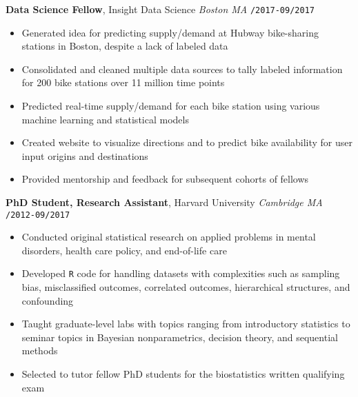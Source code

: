 \documentclass[10pt,english]{report}
\begin{document}
\textbf{Data Science Fellow}, Insight Data Science \hfill \textit{Boston MA} \texttt{/2017-09/2017}
\begin{itemize}
\item Generated idea for predicting supply/demand at Hubway bike-sharing stations in Boston, despite a lack of labeled data
\item Consolidated and cleaned multiple data sources to tally labeled information for 200 bike stations over 11 million time points
\item Predicted real-time supply/demand for each bike station using various machine learning and statistical models
\item Created website to visualize directions and to predict bike availability for user input origins and destinations
\item Provided mentorship and feedback for subsequent cohorts of fellows
\end{itemize}

\vspace{1mm}

\textbf{PhD Student, Research Assistant}, Harvard University \hfill \textit{Cambridge MA} \texttt{/2012-09/2017}
\begin{itemize}
\item Conducted original statistical research on applied problems in mental disorders, health care policy, and end-of-life care
\item Developed \texttt{R} code for handling datasets with complexities such as sampling bias, misclassified outcomes, correlated outcomes, hierarchical structures, and confounding
\item Taught graduate-level labs with topics ranging from introductory statistics to seminar topics in Bayesian nonparametrics, decision theory, and sequential methods
\item Selected to tutor fellow PhD students for the biostatistics written qualifying exam
\end{itemize}

\vspace{1mm}
\end{document}
